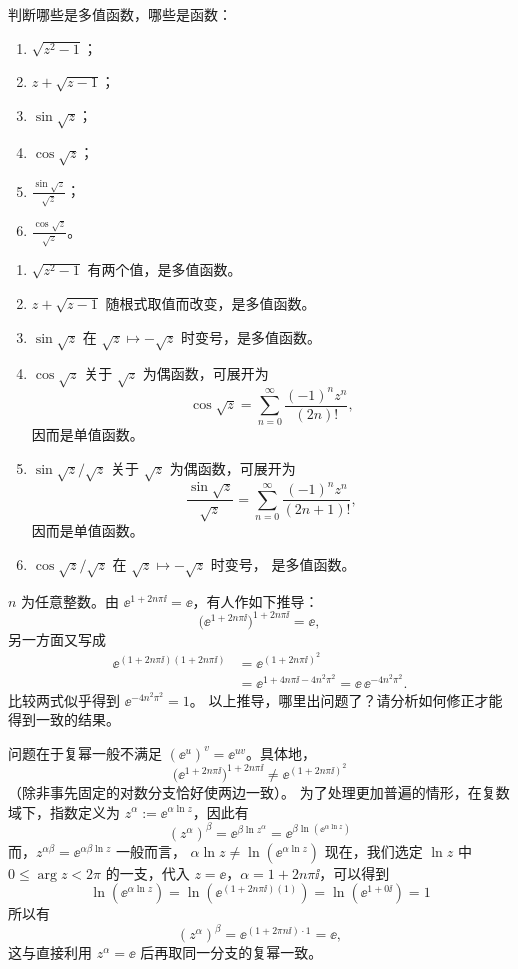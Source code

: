 \begin{question}
判断哪些是多值函数，哪些是函数：
\begin{enumerate}
  \item \(\sqrt{z^2 - 1}\)；
  \item \(z + \sqrt{z - 1}\)；
  \item \(\sin \sqrt{z}\)；
  \item \(\cos \sqrt{z}\)；
  \item \(\displaystyle \frac{\sin \sqrt{z}}{\sqrt{z}}\)；
  \item \(\displaystyle \frac{\cos \sqrt{z}}{\sqrt{z}}\)。
\end{enumerate}
\begin{solution}
\begin{enumerate}
  \item \(\sqrt{z^2-1}\) 有两个值，是多值函数。
  \item \(z+\sqrt{z-1}\) 随根式取值而改变，是多值函数。
  \item \(\sin\sqrt z\) 在 \(\sqrt z\mapsto-\sqrt z\) 时变号，是多值函数。
  \item \(\cos\sqrt z\) 关于 \(\sqrt z\) 为偶函数，可展开为
  \[
  \cos\sqrt z=\sum_{n=0}^{\infty}\frac{(-1)^n z^n}{(2n)!},
  \]
  因而是单值函数。
  \item \(\sin\sqrt z/\sqrt z\) 关于 \(\sqrt z\) 为偶函数，可展开为
  \[
  \frac{\sin\sqrt z}{\sqrt z}
  =\sum_{n=0}^{\infty}\frac{(-1)^n z^n}{(2n+1)!},
  \]
  因而是单值函数。
  \item \(\cos\sqrt z/\sqrt z\) 在 \(\sqrt z\mapsto-\sqrt z\) 时变号，
  是多值函数。
\end{enumerate}
\end{solution}
\end{question}

\begin{question}
\(n\) 为任意整数。由 \(\ee^{1+2n\pi\ii}=\ee\)，有人作如下推导：
\[
\bigl(\ee^{1+2n\pi\ii}\bigr)^{1+2n\pi\ii}=\ee,
\]
另一方面又写成
\[
\begin{aligned}
\ee^{(1+2n\pi\ii)(1+2n\pi\ii)}
&=\ee^{(1+2n\pi\ii)^2}\\
&=\ee^{1+4n\pi\ii-4n^2\pi^2}
=\ee\,\ee^{-4n^2\pi^2}.
\end{aligned}
\]
比较两式似乎得到 \(\ee^{-4n^2\pi^2}=1\)。
以上推导，哪里出问题了？请分析如何修正才能得到一致的结果。
\begin{solution}
问题在于复幂一般不满足 \((\ee^u)^v=\ee^{uv}\)。具体地，
\[
\bigl(\ee^{1+2n\pi\ii}\bigr)^{1+2n\pi\ii}
\ne \ee^{(1+2n\pi\ii)^2}
\]
（除非事先固定的对数分支恰好使两边一致）。
为了处理更加普遍的情形，在复数域下，指数定义为 \(z^\alpha := \ee^{\alpha \ln z}\)，因此有 \[
(z^{\alpha})^\beta = \ee^{\beta \ln z^\alpha} = \ee^{\beta \ln (\ee^{\alpha \ln z})}
\]
而，\( z^{\alpha \beta}= \ee^{\alpha \beta \ln z} \)
一般而言， \( \alpha \ln z \neq \ln (\ee^{\alpha \ln z}) \)
现在，我们选定 \(\ln z\) 中 \(0 \le \arg z < 2\pi\) 的一支，代入 \(z=\ee\)，\(\alpha = 1+2n \pi \ii\)，可以得到 \[
\ln(\ee^{\alpha \ln z}) =\ln (\ee^{(1+2n \pi \ii)(1)})=\ln (\ee^{1+0 \ii})=1
\]
所以有
\[
(z^{\alpha})^{\beta}
=\ee^{(1+2\pi n\ii)\cdot1}
=\ee,
\]
这与直接利用 \(z^\alpha=\ee\) 后再取同一分支的复幂一致。
\end{solution}
\end{question}
